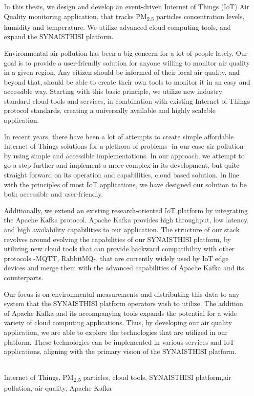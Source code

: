 
\begin{abstracteng}
In this thesis, we design and develop an event-driven Ιnternet of Things (IoT) Air Quality monitoring application, that tracks PM\textsubscript{2.5} particles concentration levels, humidity and temperature. We utilize advanced cloud computing tools, and expand the SYNAISTHISI platform.

Environmental air pollution has been a big concern for a lot of people lately. Our goal is to provide a user-friendly solution for anyone willing to monitor air quality in a given region. Any citizen should be informed of their local air quality, and beyond that, should be able to create their own tools to monitor it in an easy and accessible way. Starting with this basic principle, we utilize new industry standard cloud tools and services, in combination with existing Internet of Things protocol standards, creating a universally available and highly scalable application. 

In recent years, there have been a lot of attempts to create simple affordable Internet of Things solutions for a plethora of problems -in our case air pollution- by using simple and accessible implementations. In our approach, we attempt to go a step further and implement a more complex in its development, but quite straight forward on its operation and capabilities, cloud based solution. In line with the principles of most IoT applications, we have designed our solution to be both accessible and user-friendly.

Additionally, we extend an existing research-oriented IoT platform by integrating the Apache Kafka protocol. Apache Kafka provides high throughput, low latency, and high availability capabilities to our application. The structure of our stack revolves around evolving the capabilities of our SYNAISTHISI platform, by utilizing new cloud tools that can provide backward compatibility with other protocols -MQTT, RabbitMQ-, that are currently widely used by IoT edge devices and merge them with the advanced capabilities of Apache Kafka and its counterparts.

Our focus is on environmental measurements and distributing this data to any system that the SYNAISTHISI platform operators wish to utilize. The addition of Apache Kafka and its accompanying tools expands the potential for a wide variety of cloud computing applications. Thus, by developing our air quality application, we are able to explore the technologies that are utilized in our platform. These technologies can be implemented in various services and IoT applications, aligning with the primary vision of the SYNAISTHISI platform.

\vspace*{\fill}
\\ 
Ιnternet of Things, PM\textsubscript{2.5} particles, cloud tools, SYNAISTHISI platform,air pollution, air quality, Apache Kafka
\end{abstracteng}